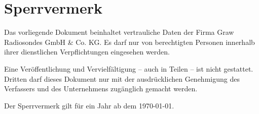 \section*{Sperrvermerk}
Das vorliegende Dokument beinhaltet vertrauliche Daten der Firma Graw Radiosondes GmbH \& Co. KG.
Es darf nur von berechtigten Personen innerhalb ihrer dienstlichen Verpflichtungen eingesehen werden.

Eine Veröffentlichung und Vervielfältigung – auch in Teilen – ist nicht gestattet.
Dritten darf dieses Dokument nur mit der ausdrücklichen Genehmigung des Verfassers und des Unternehmens zugänglich gemacht werden.

Der Sperrvermerk gilt für ein Jahr ab dem \today.
